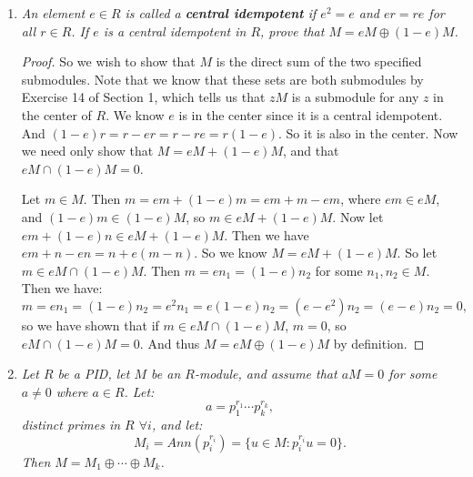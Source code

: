\documentclass[9pt,reqno,twoside]{amsbook}
\theoremstyle{plain}
\numberwithin{section}{chapter}
\numberwithin{equation}{chapter}
\theoremstyle{definition}
\theoremstyle{remark}
\theoremstyle{plain}
\renewcommand{\phi}{\varphi}
\begin{document}
\begin{enumerate}[label=\arabic*.]
\begin{enumerate}
\begin{proof}
\textbf{Injectivity: } Let $\Phi((\phi_1,\psi_1)) =(\phi_1,\psi_1) = (\phi_2,\psi_2) =  \Phi((\phi_2,\psi_2))$. Then we must have $\phi_1 = \phi_2$, and $\psi_1 = \psi_2$, since otherwise we do not have equality of these ordered pairs of hom-sms in $H$. But then we have shown that the arguments of $\Phi$ are equal in this case, so $\Phi$ must be injective. 
\end{proof}
\end{enumerate}

\setcounter{enumi}{14}
\item \textit{An element $e \in R$ is called a \textbf{central idempotent} if $e^2 = e$ and $er = re$ for all $r \in R$. If $e$ is a central idempotent in $R$, prove that $M = eM \oplus (1 - e)M$. }

\begin{proof}
So we wish to show that $M$ is the direct sum of the two specified submodules. Note that we know that these sets are both submodules by Exercise 14 of Section 1, which tells us that $zM$ is a submodule for any $z$ in the center of $R$. We know $e$ is in the center since it is a central idempotent. And $(1 - e)r = r - er = r - re = r(1 - e)$. So it is also in the center. Now we need only show that $M = eM + (1 - e)M$, and that $eM \cap (1 - e)M = 0$. 


Let $m \in M$. Then $m = em + (1 - e)m = em + m - em$, where $em \in eM$, and $(1 - e)m \in (1 - e)M$, so $m \in eM + (1 - e)M$. Now let $em + (1 - e)n \in eM + (1 - e)M$. Then we have $em + n - en = n + e(m - n)$. So we know $M = eM + (1 - e)M$. So let $m \in eM \cap (1 - e)M$. Then $m = en_1 = (1 - e)n_2$ for some $n_1,n_2 \in M$. Then we have: 
$$
m = en_1 = (1 - e)n_2 = e^2n_1 = e(1 - e)n_2 = (e - e^2)n_2 = (e - e)n_2 = 0,
$$
so we have shown that if $m \in eM \cap (1 - e)M$, $m = 0$, so $eM \cap (1 - e)M = 0$. And thus $M = eM \oplus (1 - e)M$ by definition. 
\end{proof}

\setcounter{enumi}{17}
\item \textit{Let $R$ be a PID, let $M$ be an $R$-module, and assume that $aM = 0$ for some $a \neq 0$ where $a \in R$. Let:
$$
a = p_1^{r_1}\cdots p_k^{r_k},
$$
distinct primes in $R$ $\forall i$, and let: $$
M_i = Ann(p_i^{r_i}) = \{u \in M: p_i^{r_i}u = 0\}.
$$
 Then $M = M_1 \oplus \cdots \oplus M_k$. }
 

\end{enumerate}
\end{document}
